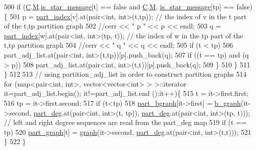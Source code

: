 \begin{DoxyCode}
500       \textcolor{keywordflow}{if} (\hyperlink{classmarked__graph__encoder_af82bc0653414091291cb75553a407bdb}{C}.\hyperlink{classcolored__graph_ab72c568fe12f7c849ca6bffb145aec47}{M}.\hyperlink{classgraph__message_a55ff5531a0043106369e84a7bc45e22d}{is\_star\_message}[t] == \textcolor{keyword}{false} and \hyperlink{classmarked__graph__encoder_af82bc0653414091291cb75553a407bdb}{C}.\hyperlink{classcolored__graph_ab72c568fe12f7c849ca6bffb145aec47}{M}.
      \hyperlink{classgraph__message_a55ff5531a0043106369e84a7bc45e22d}{is\_star\_message}[tp] == \textcolor{keyword}{false})\{
501         p = \hyperlink{classmarked__graph__encoder_a1d3e2b90f5d46244fd4cb33c69ac81f1}{part\_index}[v].at(pair<int, int>(t,tp)); \textcolor{comment}{// the index of v in the t part of the t,tp
       partition graph}
502         \textcolor{comment}{//cerr << " p " << p << endl;}
503         q = \hyperlink{classmarked__graph__encoder_a1d3e2b90f5d46244fd4cb33c69ac81f1}{part\_index}[w].at(pair<int, int>(tp, t)); \textcolor{comment}{// the index of w in the tp part of the t,tp
       partition graph}
504         \textcolor{comment}{//cerr << " q " << q << endl;}
505         \textcolor{keywordflow}{if} (t < tp)
506           part\_adj\_list.at(pair<int, int>(t,tp))[p].push\_back(q);
507         \textcolor{keywordflow}{if} ((t == tp) and (q > p))
508           part\_adj\_list.at(pair<int, int>(t,t))[p].push\_back(q);
509       \}
510     \}
511   \}
512 
513   \textcolor{comment}{// using partition\_adj\_list in order to construct partition graphs}
514   \textcolor{keywordflow}{for} (map<pair<int, int>, vector<vector<int> > >::iterator it=part\_adj\_list.begin(); it!=part\_adj\_list.end
      ();it++)\{
515     t = it->first.first;
516     tp = it->first.second;
517     \textcolor{keywordflow}{if} (t<tp)
518       \hyperlink{classmarked__graph__encoder_a5faebef707fb681c0b6c2ccf64abc04c}{part\_bgraph}[it->first] = \hyperlink{classb__graph}{b\_graph}(it->second, \hyperlink{classmarked__graph__encoder_a55ea2edb2609dfc287432f61900d6ad1}{part\_deg}.at(pair<int, int>(t,
      tp)), \hyperlink{classmarked__graph__encoder_a55ea2edb2609dfc287432f61900d6ad1}{part\_deg}.at(pair<int, int>(tp, t))); \textcolor{comment}{// left and right degree sequences are read from the
       part\_deg map}
519     \textcolor{keywordflow}{if} (t == tp)
520       \hyperlink{classmarked__graph__encoder_adbafd0769ae301acc1b2c19b5e1d4844}{part\_graph}[t] = \hyperlink{classgraph}{graph}(it->second, \hyperlink{classmarked__graph__encoder_a55ea2edb2609dfc287432f61900d6ad1}{part\_deg}.at(pair<int, int>(t,t)));
521   \}
522 \}
\end{DoxyCode}
\mbox{\label{classmarked__graph__encoder_a1cb2cd754108302a0437a924dc70bc0e}} 
